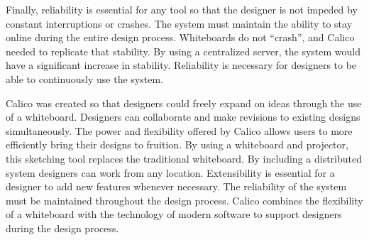 Finally, reliability is essential for any tool so that the designer is not impeded by constant interruptions or crashes. 
The system must maintain the ability to stay online during the entire design process. Whiteboards do not ``crash'', and Calico needed to replicate that stability. 
By using a centralized server, the system would have a significant increase in stability. Reliability is necessary for designers to be able to continuously use the system.


Calico was created so that designers could freely expand on ideas through the use of a whiteboard. Designers can collaborate and make revisions to existing designs simultaneously. The power and flexibility offered by Calico allows users to more efficiently bring their designs to fruition. By using a whiteboard and projector, this sketching tool replaces the traditional whiteboard. By including a distributed system designers can work from any location. Extensibility is essential for a designer to add new features whenever necessary. The reliability of the system must be maintained throughout the design process. Calico combines the flexibility of a whiteboard with the technology of modern software to support designers during the design process.







